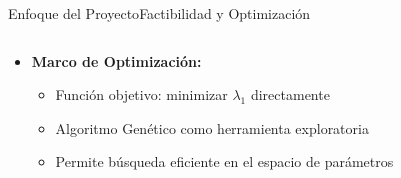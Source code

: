 \begin{frame}{Enfoque del Proyecto}{Factibilidad y Optimización}
\begin{columns}
\begin{column}{0.6\textwidth}
\begin{itemize}
\begin{itemize}
                \end{itemize}
                \item \textbf{Marco de Optimización:} %
                \begin{itemize}
                    \item Función objetivo: minimizar $\lambda_1$ directamente
                    \item Algoritmo Genético como herramienta exploratoria
                    \item Permite búsqueda eficiente en el espacio de parámetros
                \end{itemize}
            \end{itemize}
        \end{column}
    \end{columns}
\end{frame}